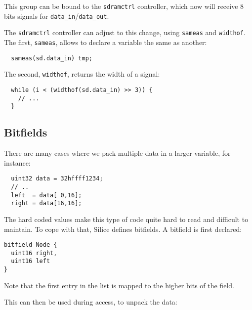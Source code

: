 \documentclass[a4]{article}
\newcommand\silice{Silice}
\begin{document}
This group can be bound to the \texttt{sdramctrl} controller, which
now will receive 8 bits signals for \texttt{data\_in}/\texttt{data\_out}.

The \texttt{sdramctrl} controller can adjust to this change, using \texttt{sameas} and \texttt{widthof}. The first, \texttt{sameas}, allows to declare a variable the same as another:

\begin{verbatim}
  sameas(sd.data_in) tmp;
\end{verbatim}

\noindent The second, \texttt{widthof}, returns the width of a signal:
\begin{verbatim}
  while (i < (widthof(sd.data_in) >> 3)) {
    // ...
  }
\end{verbatim}

\vspace*{5mm}
\noindent
{}


\subsection{Bitfields}
\label{sec:bitfields}

There are many cases where we pack multiple data in a larger variable, for instance:

\begin{verbatim}
  uint32 data = 32hffff1234;
  // ..
  left  = data[ 0,16];
  right = data[16,16];
\end{verbatim}

The hard coded values make this type of code quite hard to read and difficult to maintain. To cope with that, \silice{} defines bitfields. A bitfield is first declared:

\begin{verbatim}
bitfield Node {
  uint16 right,
  uint16 left
}
\end{verbatim}

Note that the first entry in the list is mapped to the higher bits of the field.

This can then be used during access, to unpack the data:
\end{document}
